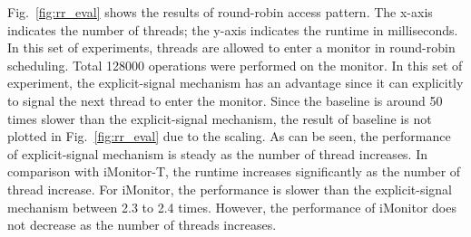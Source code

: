 \documentclass[preprint]{sigplanconf}
\begin{document}
%


%
Fig.~\ref{fig:rr_eval} shows the results of round-robin access pattern. The
x-axis indicates the number of threads; the y-axis indicates the
runtime in milliseconds. In this set of experiments, threads are allowed to enter a
monitor in round-robin scheduling. Total 128000 operations were performed on 
the monitor. In this set of experiment, the explicit-signal mechanism has an 
advantage since it can explicitly to signal the next thread to enter the 
monitor. Since the baseline is around 50 times slower than the explicit-signal
mechanism, the result of baseline is not plotted in Fig.~\ref{fig:rr_eval} due
to the scaling. 
As can be seen, the performance of explicit-signal mechanism is steady 
as the number of thread increases. In comparison with iMonitor-T, the runtime 
increases significantly as the number of thread increase. For iMonitor, the 
performance is slower than the explicit-signal mechanism between 2.3 to 2.4
times. However, the performance of iMonitor does not decrease as the number of
threads increases. 
\end{document}
